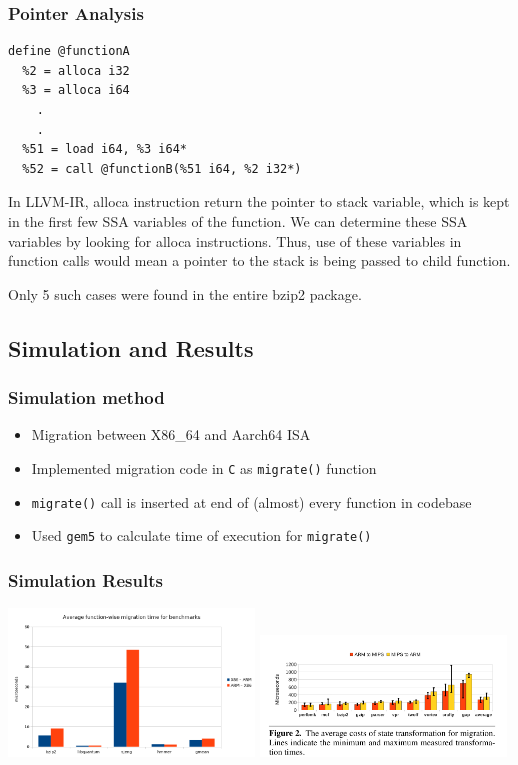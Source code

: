 \documentclass[10pt]{beamer}
\begin{document}
\begin{frame}[fragile]
\frametitle{Pointer Analysis}
\begin{lstlisting}
define @functionA
  %2 = alloca i32
  %3 = alloca i64
    .
    .
  %51 = load i64, %3 i64*
  %52 = call @functionB(%51 i64, %2 i32*)
\end{lstlisting}

In LLVM-IR, alloca instruction return the pointer to stack variable, which is kept in the first few SSA variables of the function. We can determine these SSA variables by looking for alloca instructions. Thus, use of these variables in function calls would mean a pointer to the stack is being passed to child function.

Only 5 such cases were found in the entire bzip2 package.
\end{frame}

\subsection{Simulation and Results}

\begin{frame}
\frametitle{Simulation method}

    \begin{itemize}
        \item Migration between X86\_64 and Aarch64 ISA
        \item Implemented migration code in \texttt{C} as \texttt{migrate()} function
        \item \texttt{migrate()} call is inserted at end of (almost) every function in codebase
        \item Used \texttt{gem5} to calculate time of execution for \texttt{migrate()}
    \end{itemize}
\end{frame}

\begin{frame}
\frametitle{Simulation Results}

\includegraphics[width=0.49\textwidth]{our-plot}
\includegraphics[width=0.49\textwidth]{tullsen-plot}

\end{frame}
\end{document}

